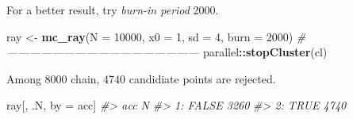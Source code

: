 \documentclass[]{book}
\newenvironment{Shaded}{\begin{snugshade}}{\end{snugshade}}
\newcommand{\CommentTok}[1]{\textcolor[rgb]{0.56,0.35,0.01}{\textit{#1}}}
\newcommand{\ControlFlowTok}[1]{\textcolor[rgb]{0.13,0.29,0.53}{\textbf{#1}}}
\newcommand{\DataTypeTok}[1]{\textcolor[rgb]{0.13,0.29,0.53}{#1}}
\newcommand{\DecValTok}[1]{\textcolor[rgb]{0.00,0.00,0.81}{#1}}
\newcommand{\KeywordTok}[1]{\textcolor[rgb]{0.13,0.29,0.53}{\textbf{#1}}}
\newcommand{\NormalTok}[1]{#1}
\newcommand{\OperatorTok}[1]{\textcolor[rgb]{0.81,0.36,0.00}{\textbf{#1}}}
\newcommand{\OtherTok}[1]{\textcolor[rgb]{0.56,0.35,0.01}{#1}}
\newcommand{\StringTok}[1]{\textcolor[rgb]{0.31,0.60,0.02}{#1}}
\theoremstyle{definition}
\theoremstyle{definition}
\theoremstyle{definition}
\theoremstyle{remark}
\begin{document}
\begin{Shaded}
\end{Shaded}

For a better result, try \emph{burn-in period} 2000.

\begin{Shaded}
\begin{Highlighting}[]
\NormalTok{ray <-}\StringTok{ }\KeywordTok{mc_ray}\NormalTok{(}\DataTypeTok{N =} \DecValTok{10000}\NormalTok{, }\DataTypeTok{x0 =} \DecValTok{1}\NormalTok{, }\DataTypeTok{sd =} \DecValTok{4}\NormalTok{, }\DataTypeTok{burn =} \DecValTok{2000}\NormalTok{)}
\CommentTok{#---------------------------------------------------}
\NormalTok{parallel}\OperatorTok{::}\KeywordTok{stopCluster}\NormalTok{(cl)}
\end{Highlighting}
\end{Shaded}

Among 8000 chain, 4740 candidiate points are rejected.

\begin{Shaded}
\begin{Highlighting}[]
\NormalTok{ray[,}
\NormalTok{    .N,}
\NormalTok{    by =}\StringTok{ }\NormalTok{acc]}
\CommentTok{#>      acc    N}
\CommentTok{#> 1: FALSE 3260}
\CommentTok{#> 2:  TRUE 4740}
\end{Highlighting}
\end{Shaded}
\end{document}

